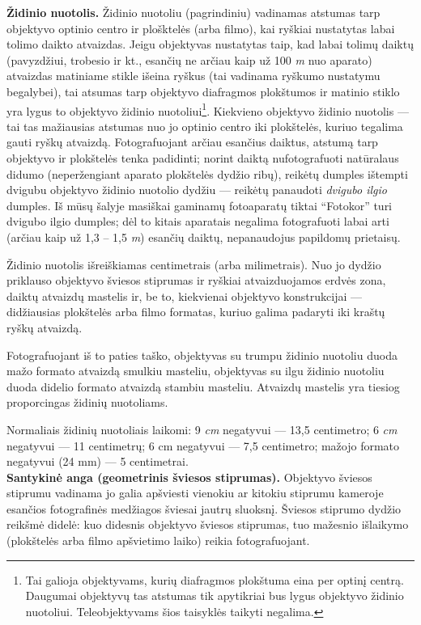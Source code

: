 \documentclass[12pt]{book}
\begin{document}
					\textbf{Židinio nuotolis.} Židinio nuotoliu (pagrindiniu) vadinamas atstumas tarp objektyvo optinio centro ir plošktelės (arba filmo), kai ryškiai nustatytas labai tolimo daikto atvaizdas. Jeigu objektyvas nustatytas taip, kad labai tolimų daiktų (pavyzdžiui, trobesio ir kt., esančių ne arčiau kaip už 100 \textit{m} nuo aparato) atvaizdas matiniame stikle išeina ryškus (tai vadinama ryškumo nustatymu begalybei), tai atsumas tarp objektyvo diafragmos plokštumos ir matinio stiklo yra lygus to objektyvo židinio nuotoliui\footnote{Tai galioja objektyvams, kurių diafragmos plokštuma eina per optinį centrą. Daugumai objektyvų tas atstumas tik apytikriai bus lygus objektyvo židinio nuotoliui. Teleobjektyvams šios taisyklės taikyti negalima.}. Kiekvieno objektyvo židinio nuotolis --- tai tas mažiausias atstumas nuo jo optinio centro iki plokštelės, kuriuo tegalima gauti ryškų atvaizdą. Fotografuojant arčiau esančius daiktus, atstumą tarp objektyvo ir plokštelės tenka padidinti; norint daiktą nufotografuoti natūralaus didumo (neperžengiant aparato plokštelės dydžio ribų), reikėtų dumples ištempti dvigubu objektyvo židinio nuotolio dydžiu --- reikėtų panaudoti \textit{dvigubo ilgio} dumples. Iš mūsų šalyje masiškai gaminamų fotoaparatų tiktai ``Fotokor'' turi dvigubo ilgio dumples; dėl to kitais aparatais negalima fotografuoti labai arti (arčiau kaip už 1,3 -- 1,5 \textit{m}) esančių daiktų, nepanaudojus papildomų prietaisų.

					Židinio nuotolis išreiškiamas centimetrais (arba milimetrais). Nuo jo dydžio priklauso objektyvo šviesos stiprumas ir ryškiai atvaizduojamos erdvės zona, daiktų atvaizdų mastelis ir, be to, kiekvienai objektyvo konstrukcijai --- didžiausias plokštelės arba filmo formatas, kuriuo galima padaryti iki kraštų ryškų atvaizdą.

					Fotografuojant iš to paties taško, objektyvas su trumpu židinio nuotoliu duoda mažo formato atvaizdą smulkiu masteliu, objektyvas su ilgu židinio nuotoliu duoda didelio formato atvaizdą stambiu masteliu. Atvaizdų mastelis yra tiesiog proporcingas židinių nuotoliams.

					Normaliais židinių nuotoliais laikomi: 9  \textit{cm} negatyvui --- 13,5 centimetro; 6  \textit{cm} negatyvui --- 11 centimetrų; 6  cm negatyvui --- 7,5 centimetro; mažojo formato negatyvui (24  mm) --- 5 centimetrai.\\

					\textbf{Santykinė anga (geometrinis šviesos stiprumas).} Objektyvo šviesos stiprumu vadinama jo galia apšviesti vienokiu ar kitokiu stiprumu kameroje esančios fotografinės medžiagos šviesai jautrų sluoksnį. Šviesos stiprumo dydžio reikšmė didelė: kuo didesnis objektyvo šviesos stiprumas, tuo mažesnio išlaikymo (plokštelės arba filmo apšvietimo laiko) reikia fotografuojant.
\end{document}
